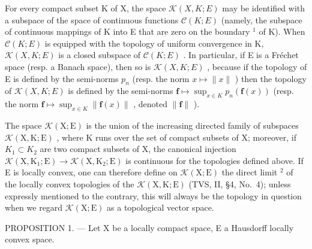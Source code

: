 For every compact subset K of X, the space \(\mathcal{K}(X,K;E)\) may be identified with a subspace of the space of continuous functions \(\mathcal{C}(K;E)\) (namely, the subspace of continuous mappings of K into E that are zero on the boundary \(^{1}\) of K). When \(\mathcal{C}(K;E)\) is equipped with the topology of uniform convergence in K, \(\mathcal{K}(X,K;E)\) is a closed subspace of \(\mathcal{C}(K;E)\) . In particular, if E is a Fréchet space (resp. a Banach space), then so is \(\mathcal{K}(X,K;E)\) , because if the topology of E is defined by the semi-norms \(p_{n}\) (resp. the norm \(x \mapsto \|x\|\) ) then the topology of \(\mathcal{K}(X,K;E)\) is defined by the semi-norms \(\mathbf{f} \mapsto \sup_{x \in K} p_n(\mathbf{f}(x))\) (resp. the norm \(\mathbf{f} \mapsto \sup_{x \in K} \| \mathbf{f}(x) \|\) , denoted \(\| \mathbf{f} \|\) ).

The space \(\mathcal{K}(\mathrm{X};\mathrm{E})\) is the union of the increasing directed family of subspaces \(\mathcal{K}(\mathrm{X},\mathrm{K};\mathrm{E})\) , where K runs over the set of compact subsets of X; moreover, if \(K_{1}\subset K_{2}\) are two compact subsets of X, the canonical injection \(\mathcal{K}(\mathrm{X},\mathrm{K}_{1};\mathrm{E})\to\mathcal{K}(\mathrm{X},\mathrm{K}_{2};\mathrm{E})\) is continuous for the topologies defined above. If E is locally convex, one can therefore define on \(\mathcal{K}(\mathrm{X};\mathrm{E})\) the direct limit \(^{2}\) of the locally convex topologies of the \(\mathcal{K}(\mathrm{X},\mathrm{K};\mathrm{E})\) (TVS, II, §4, No.~4); unless expressly mentioned to the contrary, this will always be the topology in question when we regard \(\mathcal{K}(\mathrm{X};\mathrm{E})\) as a topological vector space.

PROPOSITION 1. --- Let X be a locally compact space, E a Hausdorff locally convex space.

